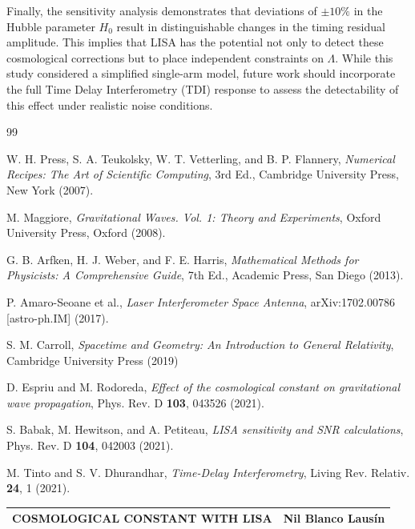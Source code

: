 \documentclass[twocolumn]{revtex4-2}
\begin{document}
Finally, the sensitivity analysis demonstrates that deviations of $\pm 10\%$ in the Hubble parameter $H_0$ result in distinguishable changes in the timing residual amplitude. This implies that LISA has the potential not only to detect these cosmological corrections but to place independent constraints on $\Lambda$. While this study considered a simplified single-arm model, future work should incorporate the full Time Delay Interferometry (TDI) response to assess the detectability of this effect under realistic noise conditions.


\begin{thebibliography}{99}


 W. H. Press, S. A. Teukolsky, W. T. Vetterling, and B. P. Flannery, \textsl{Numerical Recipes: The Art of Scientific Computing}, 3rd Ed., Cambridge University Press, New York (2007).


 M. Maggiore, \textsl{Gravitational Waves. Vol. 1: Theory and Experiments}, Oxford University Press, Oxford (2008).


 G. B. Arfken, H. J. Weber, and F. E. Harris, \textsl{Mathematical Methods for Physicists: A Comprehensive Guide}, 7th Ed., Academic Press, San Diego (2013).


 P. Amaro-Seoane et al., \textsl{Laser Interferometer Space Antenna}, arXiv:1702.00786 [astro-ph.IM] (2017).

 S. M. Carroll, \textsl{Spacetime and Geometry: An Introduction to General Relativity}, Cambridge University Press (2019)




 D. Espriu and M. Rodoreda, \textsl{Effect of the cosmological constant on gravitational wave propagation}, Phys. Rev. D \textbf{103}, 043526 (2021).


 S. Babak, M. Hewitson, and A. Petiteau, \textsl{LISA sensitivity and SNR calculations}, Phys. Rev. D \textbf{104}, 042003 (2021).

 M. Tinto and S. V. Dhurandhar, \textsl{Time-Delay Interferometry}, Living Rev. Relativ. \textbf{24}, 1 (2021).

\end{thebibliography}

\clearpage
\onecolumngrid 
\thispagestyle{empty} 


\noindent
\begin{tabular*}{\textwidth}{@{\extracolsep{\fill}}lr}
    \textbf{COSMOLOGICAL CONSTANT WITH LISA} & \textbf{Nil Blanco Lausín} \\
    \hline
\end{tabular*}
\end{document}
